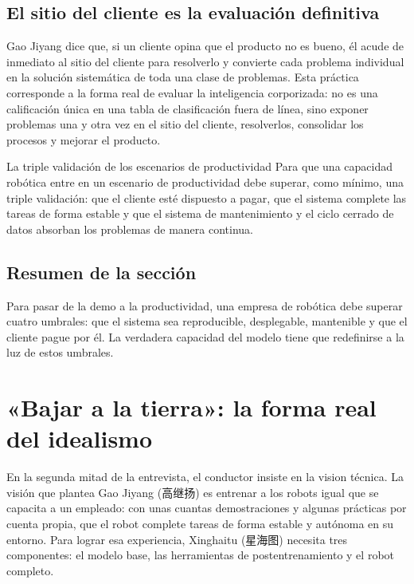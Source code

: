 \documentclass[a4paper]{article}
\begin{document}
\subsection{El sitio del cliente es la evaluación definitiva}

Gao Jiyang dice que, si un cliente opina que el producto no es bueno, él acude de inmediato al sitio del cliente para resolverlo y convierte cada problema individual en la solución sistemática de toda una clase de problemas. Esta práctica corresponde a la forma real de evaluar la inteligencia corporizada: no es una calificación única en una tabla de clasificación fuera de línea, sino exponer problemas una y otra vez en el sitio del cliente, resolverlos, consolidar los procesos y mejorar el producto.

\begin{importantbox}{La triple validación de los escenarios de productividad}
Para que una capacidad robótica entre en un escenario de productividad debe superar, como mínimo, una triple validación: que el cliente esté dispuesto a pagar, que el sistema complete las tareas de forma estable y que el sistema de mantenimiento y el ciclo cerrado de datos absorban los problemas de manera continua.
\end{importantbox}

\subsection{Resumen de la sección}

Para pasar de la demo a la productividad, una empresa de robótica debe superar cuatro umbrales: que el sistema sea reproducible, desplegable, mantenible y que el cliente pague por él. La verdadera capacidad del modelo tiene que redefinirse a la luz de estos umbrales.
\section{«Bajar a la tierra»: la forma real del idealismo}

En la segunda mitad de la entrevista, el conductor insiste en la vision técnica. La visión que plantea Gao Jiyang (高继扬) es entrenar a los robots igual que se capacita a un empleado: con unas cuantas demostraciones y algunas prácticas por cuenta propia, que el robot complete tareas de forma estable y autónoma en su entorno. Para lograr esa experiencia, Xinghaitu (星海图) necesita tres componentes: el modelo base, las herramientas de postentrenamiento y el robot completo.
\end{document}
